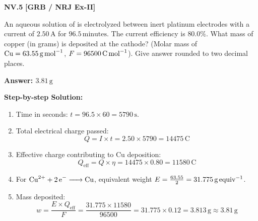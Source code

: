 \begin{problembox}
\textbf{NV.5} \hfill \textbf{[GRB / NRJ Ex-II]}

An aqueous solution of  is electrolyzed between inert platinum electrodes with a current of $2.50\,\text{A}$ for $96.5\,\text{minutes}$. The current efficiency is $80.0\%$. What mass of copper (in grams) is deposited at the cathode? (Molar mass of $\ce{Cu} = 63.55\,\text{g\,mol}^{-1}$, $F = 96500\,\text{C\,mol}^{-1}$). Give answer rounded to two decimal places.
\end{problembox}
\begin{solution}
\textbf{Answer: $3.81\,\text{g}$}

\textbf{Step-by-step Solution:}
\begin{enumerate}
    \item Time in seconds: $t = 96.5 \times 60 = 5790\,\text{s}$.
    \item Total electrical charge passed:
    \begin{equation*}
        Q = I \times t = 2.50 \times 5790 = 14475\,\text{C}
    \end{equation*}
    \item Effective charge contributing to Cu deposition:
    \begin{equation*}
        Q_{\text{eff}} = Q \times \eta = 14475 \times 0.80 = 11580\,\text{C}
    \end{equation*}
    \item For $\ce{Cu^2+ + 2e^- -> Cu}$, equivalent weight $E = \frac{63.55}{2} = 31.775\,\text{g\,equiv}^{-1}$.
    \item Mass deposited:
    \begin{equation*}
        w = \frac{E \times Q_{\text{eff}}}{F} = \frac{31.775 \times 11580}{96500} = 31.775 \times 0.12 = 3.813\,\text{g} \approx 3.81\,\text{g}
    \end{equation*}
\end{enumerate}
\end{solution}

